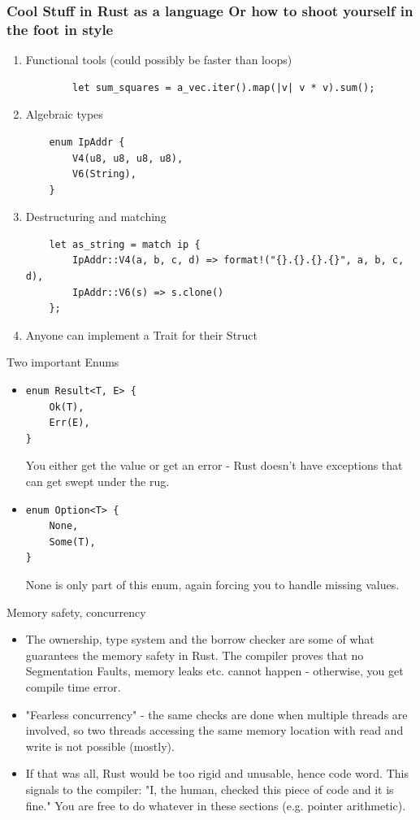\documentclass[8pt]{beamer}
\begin{document}
\begin{frame}[fragile]
\frametitle{Cool Stuff in Rust as a language \tiny{Or how to shoot yourself in the foot in style}}
\begin{enumerate}
	\item Functional tools (could possibly be faster than loops)\begin{verbatim}
		let sum_squares = a_vec.iter().map(|v| v * v).sum();
	\end{verbatim}
	\item Algebraic types \begin{verbatim}
	enum IpAddr {
		V4(u8, u8, u8, u8), 
		V6(String),
	}
	\end{verbatim}
	\item Destructuring and matching \begin{verbatim}
	let as_string = match ip {
		IpAddr::V4(a, b, c, d) => format!("{}.{}.{}.{}", a, b, c, d),
		IpAddr::V6(s) => s.clone()
	};
	\end{verbatim}
	\item Anyone can implement a Trait for their Struct
\end{enumerate}
\end{frame}

\begin{frame}[fragile]{Two important Enums}
\begin{itemize}
	\item \begin{verbatim}
enum Result<T, E> {
	Ok(T),
	Err(E),
}
		\end{verbatim}
		You either get the value or get an error - Rust doesn't have exceptions that can get swept under the rug.
	\item \begin{verbatim}
enum Option<T> {
	None,
	Some(T),
}
	\end{verbatim}
	None is only part of this enum, again forcing you to handle missing values.
\end{itemize}
\end{frame}

\begin{frame}{Memory safety, concurrency}
\begin{itemize}
\item The ownership, type system and the borrow checker are some of what guarantees the memory safety in Rust. The compiler proves that no Segmentation Faults, memory leaks etc. cannot happen - otherwise, you get compile time error. 
\item "Fearless concurrency" - the same checks are done when multiple threads are involved, so two threads accessing the same memory location with read and write is not possible (mostly). 
\item If that was all, Rust would be too rigid and unusable, hence  code word. This signals to the compiler: "I, the human, checked this piece of code and it is fine." You are free to do whatever in these sections (e.g. pointer arithmetic).
\end{itemize}
\end{frame}
\end{document}
